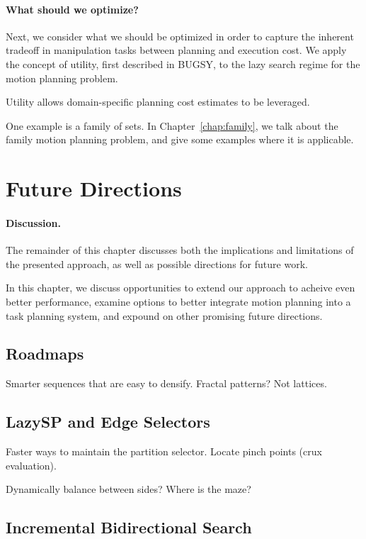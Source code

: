 \paragraph{What should we optimize?}

Next,
we consider what we should be optimized in order to capture
the inherent tradeoff in manipulation tasks
between planning and execution cost.
We apply the concept of utility,
first described in BUGSY,
to the lazy search regime for the motion planning problem.

Utility allows domain-specific planning cost estimates
to be leveraged.

One example is a family of sets.
In Chapter~\ref{chap:family},
we talk about the family motion planning problem,
and give some examples where it is applicable.

\section{Future Directions}
\label{sec:conclusion:future}

\paragraph{Discussion.}
The remainder of this chapter discusses both the implications
and limitations of the presented approach,
as well as possible directions for future work.

In this chapter,
we discuss opportunities to extend our approach to acheive even
better performance,
examine options to better integrate motion planning into a
task planning system,
and expound on other promising future directions.

\subsection{Roadmaps}

Smarter sequences that are easy to densify.
Fractal patterns?
Not lattices.

\subsection{LazySP and Edge Selectors}

Faster ways to maintain the partition selector.
Locate pinch points (crux evaluation).

Dynamically balance between sides?
Where is the maze?

\subsection{Incremental Bidirectional Search}

